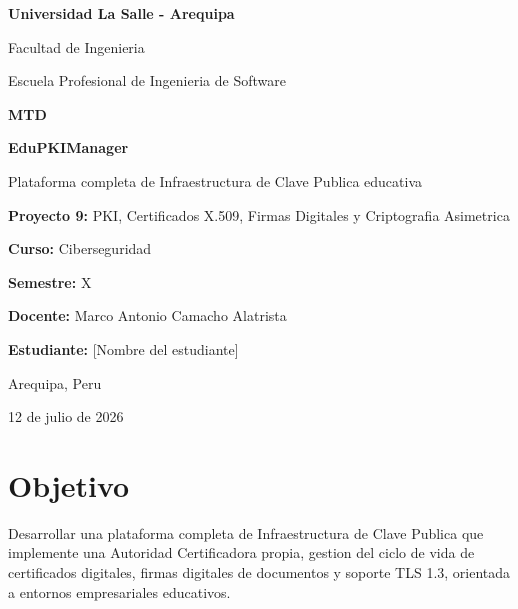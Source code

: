\documentclass[12pt,a4paper]{article}
\begin{document}
\begin{titlepage}
    \centering
    \vspace*{1.7cm}
    {\Huge\bfseries Universidad La Salle - Arequipa\par}
    \vspace{1cm}
    {\Large Facultad de Ingenieria\par}
    \vspace{0.5cm}
    {\Large Escuela Profesional de Ingenieria de Software\par}

    \vspace{3.0cm}
    {\Huge\bfseries MTD\par}
    \vspace{0.6cm}
    {\huge\bfseries EduPKIManager\par}
    \vspace{0.4cm}
    {\Large Plataforma completa de Infraestructura de Clave Publica educativa\par}

    \vspace{1.2cm}
    {\Large\textbf{Proyecto 9:} PKI, Certificados X.509, Firmas Digitales y Criptografia Asimetrica\par}

    \vfill
    {\Large\textbf{Curso:} Ciberseguridad\par}
    \vspace{0.35cm}
    {\Large\textbf{Semestre:} X\par}
    \vspace{0.35cm}
    {\Large\textbf{Docente:} Marco Antonio Camacho Alatrista\par}
    \vspace{0.35cm}
    {\Large\textbf{Estudiante:} [Nombre del estudiante]\par}

    \vspace{1.1cm}
    {\Large Arequipa, Peru\par}
    {\Large 12 de julio de 2026\par}
\end{titlepage}

\tableofcontents
\newpage

\section{Objetivo}

Desarrollar una plataforma completa de Infraestructura de Clave Publica que implemente una Autoridad Certificadora propia, gestion del ciclo de vida de certificados digitales, firmas digitales de documentos y soporte TLS 1.3, orientada a entornos empresariales educativos.
\end{document}

